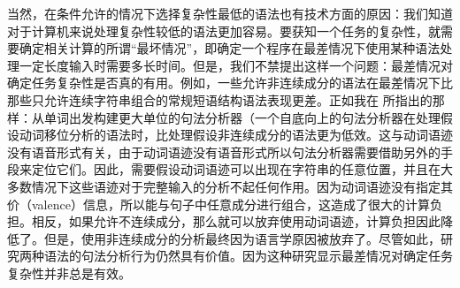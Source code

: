     当然，在条件允许的情况下选择复杂性最低的语法也有技术方面的原因：我们知道对于计算机来说处理复杂性较低的语法更加容易。要获知一个任务的复杂性，就需要确定相关计算的所谓“最坏情况”，即确定一个程序在最差情况下使用某种语法处理一定长度输入时需要多长时间。但是，我们不禁提出这样一个问题：最差情况对确定任务复杂性是否真的有用。例如，一些允许非连续成分的语法在最差情况下比那些只允许连续字符串组合的常规短语结构语法表现更差\citep[\S~8]{Reape91}。正如我在 所指出的那样：从单词出发构建更大单位的句法分析器（一个自底向上的句法分析器在处理假设动词移位分析的语法时，比处理假设非连续成分的语法更为低效。这与动词语迹没有语音形式有关，由于动词语迹没有语音形式所以句法分析器需要借助另外的手段来定位它们。因此，需要假设动词语迹可以出现在字符串的任意位置，并且在大多数情况下这些语迹对于完整输入的分析不起任何作用。因为动词语迹没有指定其价（valence）信息，所以能与句子中任意成分进行组合，这造成了很大的计算负担。相反，如果允许不连续成分，那么就可以放弃使用动词语迹，计算负担因此降低了。但是，使用非连续成分的分析最终因为语言学原因被放弃了\citep{Mueller2005c,Mueller2005d,MuellerLehrbuch1,MuellerGS}。尽管如此，研究两种语法的句法分析行为仍然具有价值。因为这种研究显示最差情况对确定任务复杂性并非总是有效。
